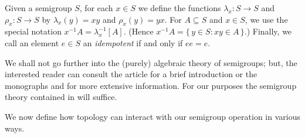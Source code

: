 \documentclass[12pt]{article}
\theoremstyle{plain}
\theoremstyle{definition}
\begin{document}
Given a semigroup $S$, for each $x \in S$ we define the functions
$\lambda_x \colon S \to S$ and $\rho_x \colon S \to S$ by
$\lambda_x(y) = xy$ and $\rho_x(y) = yx$. 
For $A \subseteq S$ and $x \in S$, we use the special notation
$x^{-1}A = \lambda_x^{-1}[A]$. 
(Hence $x^{-1}A = \{\, y \in S : xy \in A \,\}$.)
Finally, we call an element $e \in S$ an \textsl{idempotent} if and
only if $ee = e$.

We shall not go further into the (purely) algebraic theory of
semigroups; but, the interested reader can consult the article
\cite{Hollings:2007uq} for a brief introduction or the monographs 
\cite{Clifford:1961fk} and \cite{Clifford:1967fk} for more extensive
information. 
For our purposes the semigroup theory contained in \cite[Chapters 1
and 2]{Hindman:1998fk} will suffice. 

We now define how topology can interact with our semigroup operation
in various ways.  
\end{document}
